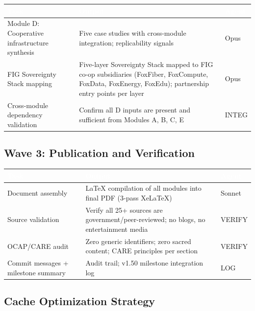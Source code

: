 \documentclass[11pt,letterpaper]{article}
\newcommand{\tableheader}[1]{\textbf{\sffamily\textcolor{white}{#1}}}
\begin{document}
\begin{center}
\begin{tabularx}{\textwidth}{L{4cm}XC{2cm}}
\toprule
{}
\tableheader{Task} & \tableheader{Output} & \tableheader{Agent} \\
\midrule
Module D: Cooperative infrastructure synthesis & Five case studies with cross-module integration; replicability signals & Opus \\
FIG Sovereignty Stack mapping & Five-layer Sovereignty Stack mapped to FIG co-op subsidiaries (FoxFiber, FoxCompute, FoxData, FoxEnergy, FoxEdu); partnership entry points per layer & Opus \\
Cross-module dependency validation & Confirm all D inputs are present and sufficient from Modules A, B, C, E & INTEG \\
\bottomrule
\end{tabularx}
\end{center}

\subsection{Wave 3: Publication and Verification}

\begin{center}
\begin{tabularx}{\textwidth}{L{4cm}XC{2cm}}
\toprule
{}
\tableheader{Task} & \tableheader{Output} & \tableheader{Agent} \\
\midrule
Document assembly & LaTeX compilation of all modules into final PDF (3-pass XeLaTeX) & Sonnet \\
Source validation & Verify all 25+ sources are government/peer-reviewed; no blogs, no entertainment media & VERIFY \\
OCAP/CARE audit & Zero generic identifiers; zero sacred content; CARE principles per section & VERIFY \\
Commit messages + milestone summary & Audit trail; v1.50 milestone integration log & LOG \\
\bottomrule
\end{tabularx}
\end{center}

\subsection{Cache Optimization Strategy}
\end{document}
